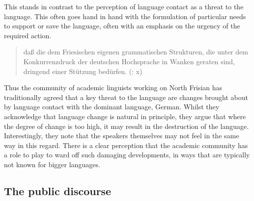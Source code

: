 \documentclass[output=paper]{langsci/langscibook}
\begin{document}
This stands in contrast to the perception of language contact as a threat to the language. This often goes hand in hand with the formulation of particular needs to support or save the language, often with an emphasis on the urgency of the required action. 

\begin{quote}
daß die dem Friesischen eigenen grammatischen Strukturen, die unter dem Konkurrenzdruck der deutschen Hochsprache in Wanken geraten sind, dringend einer Stützung bedürfen. (\citealt{WiltsEtAl1986}: x)\bigskip\\
\end{quote}

Thus the community of academic linguists working on North Frisian has traditionally agreed that a key threat to the language are changes brought about by language contact with the dominant language, German. Whilst they acknowledge that language change is natural in principle, they argue that where the degree of change is too high, it may result in the destruction of the language. Interestingly, they note that the speakers themselves may not feel in the same way in this regard. There is a clear perception that the academic community has a role to play to ward off such damaging developments, in ways that are typically not known for bigger languages.

\subsection{The public discourse}
\label{sec:gregersen:5.2}
\end{document}
